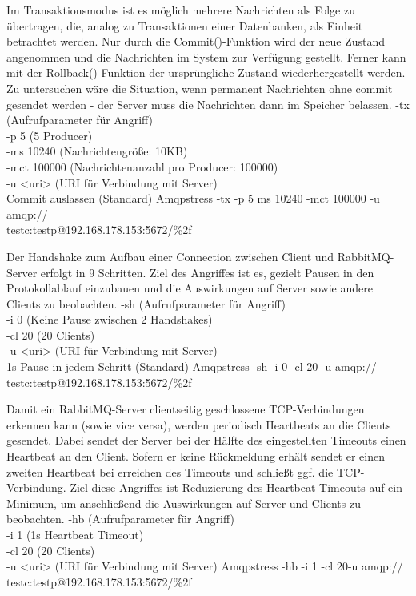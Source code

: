 \documentclass[	a4paper,
			11pt,
			oneside,
			parskip]{scrartcl}
\begin{document}
		{%
		 Im Transaktionsmodus ist es möglich mehrere Nachrichten als Folge zu übertragen, die, analog zu Transaktionen einer Datenbanken, als Einheit betrachtet werden. Nur durch die Commit()-Funktion
		 wird der neue Zustand angenommen und die Nachrichten im System zur Verfügung gestellt. Ferner kann mit der Rollback()-Funktion der ursprüngliche Zustand wiederhergestellt werden.
		 Zu untersuchen wäre die Situation, wenn permanent Nachrichten ohne commit gesendet werden - der Server muss die Nachrichten dann im Speicher belassen.
		}{%
		 -tx (Aufrufparameter für Angriff) \\
		 -p 5 (5 Producer) \\
		 -ms 10240 (Nachrichtengröße: 10KB) \\
		 -mct 100000 (Nachrichtenanzahl pro Producer: 100000) \\
		 -u <uri> (URI für Verbindung mit Server) \\
		 Commit auslassen (Standard)
		}{%
		 Amqpstress -tx -p 5 ms 10240 -mct 100000 -u amqp://\\\hspace*{3cm}testc:testp@192.168.178.153:5672/\%2f
		}
	
	
		{%
		 Der Handshake zum Aufbau einer Connection zwischen Client und RabbitMQ-Server erfolgt in 9 Schritten. Ziel des Angriffes ist es, gezielt Pausen in den Protokollablauf einzubauen und die
		 Auswirkungen auf Server sowie andere Clients zu beobachten.
		}{%
		 -sh (Aufrufparameter für Angriff) \\
		 -i 0 (Keine Pause zwischen 2 Handshakes) \\
		 -cl 20 (20 Clients) \\
		 -u <uri> (URI für Verbindung mit Server) \\
		 1s Pause in jedem Schritt (Standard) 
		}{%
		 Amqpstress -sh -i 0 -cl 20 -u amqp://\\\hspace*{3cm}testc:testp@192.168.178.153:5672/\%2f
		}


		{%
		 Damit ein RabbitMQ-Server clientseitig geschlossene TCP-Verbindungen erkennen kann (sowie vice versa), werden periodisch Heartbeats an die Clients gesendet. Dabei sendet der Server bei der Hälfte des
		 eingestellten Timeouts einen Heartbeat an den Client. Sofern er keine Rückmeldung erhält sendet er einen zweiten Heartbeat bei erreichen des Timeouts und schließt ggf. die TCP-Verbindung. Ziel diese Angriffes ist Reduzierung des Heartbeat-Timeouts auf ein Minimum, um anschließend die Auswirkungen auf Server und Clients zu beobachten. 
		}{%
		 -hb (Aufrufparameter für Angriff) \\
		 -i 1 (1s Heartbeat Timeout) \\
		 -cl 20 (20 Clients) \\
		 -u <uri> (URI für Verbindung mit Server)
		}{%
		 Amqpstress -hb -i 1 -cl 20-u amqp://\\\hspace*{3cm} testc:testp@192.168.178.153:5672/\%2f
		}
\end{document}
